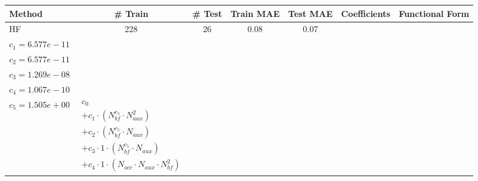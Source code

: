 \small
\setlength{\tabcolsep}{3pt}
\begin{longtable}{|l|c|c|c|c|p{3.2cm}|p{5.0cm}|}
\hline
\textbf{Method} & \textbf{\# Train} & \textbf{\# Test} & \textbf{Train MAE} & \textbf{Test MAE} & \textbf{Coefficients} & \textbf{Functional Form} \\ 
\hline
\endhead
HF & 228 & 26 & 0.08 & 0.07 & \begin{tabular}{l}\(c_{0}=3.226e+00\) \\ \(c_{1}=6.577e-11\) \\ \(c_{2}=6.577e-11\) \\ \(c_{3}=1.269e-08\) \\ \(c_{4}=1.067e-10\) \\ \(c_{5}=1.505e+00\)\end{tabular} & $\begin{array}{l}c_{0} \\ + c_{1}  \cdot  (N_{bf} ^{c_{5}}  \cdot  N_{aux} ^{2}) \\ + c_{2}  \cdot  (N_{bf} ^{c_{5}}  \cdot  N_{aux}) \\ + c_{3}  \cdot  1  \cdot  (N_{bf} ^{c_{5}}  \cdot  N_{aux}) \\ + c_{4}  \cdot  1  \cdot  (N_{occ}  \cdot  N_{aux}  \cdot  N_{bf} ^{2})\end{array}$ \\ 
\hline
\end{longtable}
